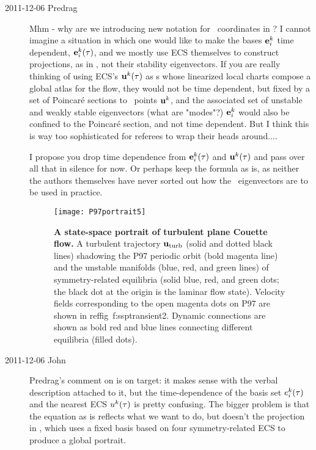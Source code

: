 \begin{description}
\item[2011-12-06 Predrag]
Mhm - why are we introducing new notation for \statesp\
coordinates in ? I cannot imagine a situation in which one
would like to make the bases  ${\bf e}^k_i$ time dependent, ${\bf e}^k_i(\tau)$,
and we mostly use ECS themselves to construct projections, as in
\reffig{f:ssptransient}, not their stability eigenvectors. If you are really
thinking of using ECS's ${\bf u}^k(\tau)$ as \template s whose linearized local
charts compose a global atlas for the flow, they would not be time dependent,
but fixed by a set of Poincar\'e sections to \statesp\ points ${\bf u}^k$, and
the associated set of unstable and weakly stable eigenvectors (what are
"modes"?) ${\bf e}_i^k$ would also be confined to the Poincar\'e section, and
not time dependent. But I think this is way too sophisticated for referees to
wrap their heads around....

I propose you drop time dependence from ${\bf e}^k_i(\tau)$ and ${\bf
u}^k(\tau)$ and pass over all that in silence for now. Or perhaps keep the
formula as is, as neither the authors themselves have never sorted out
how the \po\ eigenvectors are to be used in practice.

\begin{figure}
\texttt{[image: P97portrait5]}
\caption{
{\bf A state-space portrait of turbulent plane Couette flow.}
A turbulent trajectory ${\bf u}_{\text{turb}}$ (solid and dotted black
lines) shadowing the P97 periodic orbit (bold magenta line) and the
unstable manifolds (blue, red, and green lines) of symmetry-related
equilibria (solid blue, red, and green dots; the black dot at the origin
is the laminar flow state). Velocity fields corresponding to the open
magenta dots on P97 are shown in  reffig~{f:ssptransient2}. Dynamic
connections are shown as bold red and blue lines connecting different
equilibria (filled dots).
}
\label{f:ssptransient}
\end{figure}

\item[2011-12-06 John] Predrag's comment on  is on
target: it makes sense with the verbal description attached to it, but
the time-dependence of the basis set $e_i^k(\tau)$ and the nearest ECS
$u^k(\tau)$ is pretty confusing. The bigger problem is that the equation as
is reflects what we want to do, but doesn't the projection in
, which uses a fixed basis based on four
symmetry-related ECS to produce a global portrait.



\end{description}
